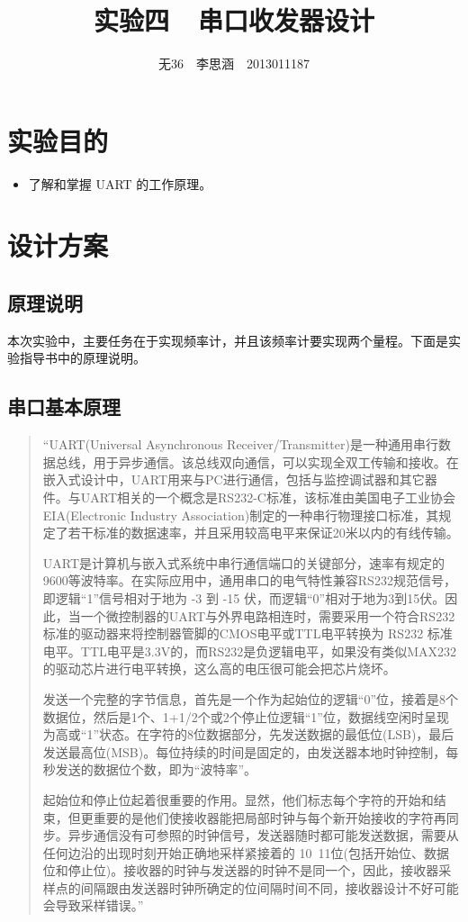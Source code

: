 \documentclass[11pt,a4paper]{article}
\begin{document}
\title{实验四\ \ 串口收发器设计}
\author{无36$\quad$李思涵$\quad$2013011187}
\maketitle

\section{实验目的}
\begin{itemize}
  \item 了解和掌握 UART 的工作原理。
\end{itemize}

\section{设计方案}
\subsection{原理说明}
本次实验中，主要任务在于实现频率计，并且该频率计要实现两个量程。下面是实验指导书中的原理说明。

\subsection{串口基本原理}
\begin{quotation}
  “UART(Universal Asynchronous Receiver/Transmitter)是一种通用串行数据总线，用于异步通信。该总线双向通信，可以实现全双工传输和接收。在嵌入式设计中，UART用来与PC进行通信，包括与监控调试器和其它器件。与UART相关的一个概念是RS232-C标准，该标准由美国电子工业协会EIA(Electronic Industry Association)制定的一种串行物理接口标准，其规定了若干标准的数据速率，并且采用较高电平来保证20米以内的有线传输。

  UART是计算机与嵌入式系统中串行通信端口的关键部分，速率有规定的9600等波特率。在实际应用中，通用串口的电气特性兼容RS232规范信号，即逻辑“1”信号相对于地为 -3 到 -15 伏，而逻辑“0”相对于地为3到15伏。因此，当一个微控制器的UART与外界电路相连时，需要采用一个符合RS232标准的驱动器来将控制器管脚的CMOS电平或TTL电平转换为 RS232 标准电平。TTL电平是3.3V的，而RS232是负逻辑电平，如果没有类似MAX232的驱动芯片进行电平转换，这么高的电压很可能会把芯片烧坏。

  发送一个完整的字节信息，首先是一个作为起始位的逻辑“0”位，接着是8个数据位，然后是1个、1+1/2个或2个停止位逻辑“1”位，数据线空闲时呈现为高或“1”状态。在字符的8位数据部分，先发送数据的最低位(LSB)，最后发送最高位(MSB)。每位持续的时间是固定的，由发送器本地时钟控制，每秒发送的数据位个数，即为“波特率”。

  起始位和停止位起着很重要的作用。显然，他们标志每个字符的开始和结束，但更重要的是他们使接收器能把局部时钟与每个新开始接收的字符再同步。异步通信没有可参照的时钟信号，发送器随时都可能发送数据，需要从任何边沿的出现时刻开始正确地采样紧接着的 10~11位(包括开始位、数据位和停止位)。接收器的时钟与发送器的时钟不是同一个，因此，接收器采样点的间隔跟由发送器时钟所确定的位间隔时间不同，接收器设计不好可能会导致采样错误。”
\end{quotation}
\end{document}
